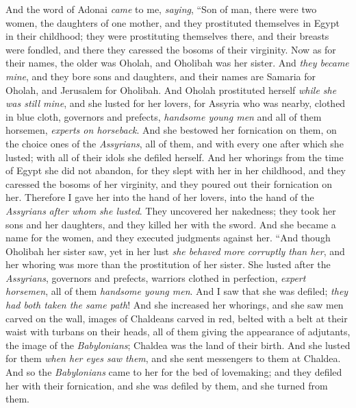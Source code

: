\begin{biblechapter} %
 And the word of Adonai \textit{came} to me, \textit{saying},
\verse “Son of man, there were two women, the daughters of one mother,
\verse and they prostituted themselves in Egypt in their childhood; they were prostituting themselves there, and their breasts were fondled, and there they caressed the bosoms of their virginity.
\verse Now as for their names, the older was Oholah, and Oholibah was her sister. And \textit{they became mine}, and they bore sons and daughters, and their names are Samaria for Oholah, and Jerusalem for Oholibah.
\verse And Oholah prostituted herself \textit{while she was still mine}, and she lusted for her lovers, for Assyria who was nearby,
\verse clothed in blue cloth, governors and prefects, \textit{handsome young men} and all of them horsemen, \textit{experts on horseback}.
\verse And she bestowed her fornication on them, on the choice ones of the \textit{Assyrians}, all of them, and with every one after which she lusted; with all of their idols she defiled herself.
\verse And her whorings from the time of Egypt she did not abandon, for they slept with her in her childhood, and they caressed the bosoms of her virginity, and they poured out their fornication on her.
\verse Therefore I gave her into the hand of her lovers, into the hand of the \textit{Assyrians} \textit{after whom she lusted}.
\verse They uncovered her nakedness; they took her sons and her daughters, and they killed her with the sword. And she became a name for the women, and they executed judgments against her.
\verse “And though Oholibah her sister saw, yet in her lust \textit{she behaved more corruptly than her}, and her whoring was more than the prostitution of her sister.
\verse She lusted after the \textit{Assyrians}, governors and prefects, warriors clothed in perfection, \textit{expert horsemen}, all of them \textit{handsome young men}.
\verse And I saw that she was defiled; \textit{they had both taken the same path}!
\verse And she increased her whorings, and she saw men carved on the wall, images of Chaldeans carved in red,
\verse belted with a belt at their waist with turbans on their heads, all of them giving the appearance of adjutants, the image of the \textit{Babylonians}; Chaldea was the land of their birth.
\verse And she lusted for them \textit{when her eyes saw them}, and she sent messengers to them at Chaldea.
\verse And so the \textit{Babylonians} came to her for the bed of lovemaking; and they defiled her with their fornication, and she was defiled by them, and she turned from them.

\end{biblechapter}
